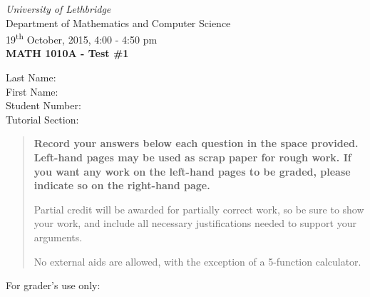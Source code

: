 \documentclass[12pt]{article}
\newcommand{\skipline}{\vspace{12pt}}
\begin{document}
\author{Instructor: Sean Fitzpatrick}
\thispagestyle{plain}
\begin{center}
\emph{University of Lethbridge}\\
Department of Mathematics and Computer Science\\
19\textsuperscript{th} October, 2015, 4:00 - 4:50 pm\\
{\bf MATH 1010A - Test \#1}\\
\end{center}
\skipline \skipline \skipline \noindent \skipline
Last Name:\underline{\hspace{50pt}{\bf Solutions}\hspace{248pt}}\\
\skipline
First Name:\underline{\hspace{50pt}{\bf The}\hspace{275pt}}\\
\skipline
Student Number:\underline{\hspace{323pt}}\\
\skipline
Tutorial Section: \underline{\hspace{320pt}}\\


\vspace{0.5in}


\begin{quote}
 {\bf Record your answers below each question in the space provided.    Left-hand pages may be used as scrap paper for rough work.  If you want any work on the left-hand pages to be graded, please indicate so on the right-hand page.
 
 \bigskip
 
Partial credit will be awarded for partially correct work, so be sure to show your work, and include all necessary justifications needed to support your arguments.

\bigskip

No external aids are allowed, with the exception of a 5-function calculator.}
\end{quote}


\vspace{0.5in}

For grader's use only:
\end{document}
